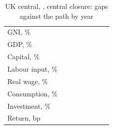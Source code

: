 \begin{table}[htbp]
\centering
\caption{UK central, \Main{}, central closure: gaps against the path by year}
\label{tab:paths}
\small
\begin{tabular}{lrrrrrrr}
\toprule
 & \genRampZeroYear{} & \genShockYear{} & \genYearAfterShock{} & \genYearTwoAfterShock{} & \genHeadYear{} & \genLastFlowYear{} & \genDebtRuleYear{} \\
\midrule
GNI, \%          & \genPathUkCentralGniTwentySeven{} & \genPathUkCentralGniTwentyEight{} & \genPathUkCentralGniTwentyNine{} & \genPathUkCentralGniThirty{} & \genPathUkCentralGniThirtyOne{} & \genPathUkCentralGniThirtyFive{} & \\
GDP, \%          & \genPathUkCentralGdpTwentySeven{} & \genPathUkCentralGdpTwentyEight{} & \genPathUkCentralGdpTwentyNine{} & \genPathUkCentralGdpThirty{} & \genPathUkCentralGdpThirtyOne{} & \genPathUkCentralGdpThirtyFive{} & \\
Capital, \%      & \genPathUkCentralCapitalTwentySeven{} & \genPathUkCentralCapitalTwentyEight{} & \genPathUkCentralCapitalTwentyNine{} & \genPathUkCentralCapitalThirty{} & \genPathUkCentralCapitalThirtyOne{} & \genPathUkCentralCapitalThirtyFive{} & \\
Labour input, \% & \genPathUkCentralLabourTwentySeven{} & \genPathUkCentralLabourTwentyEight{} & \genPathUkCentralLabourTwentyNine{} & \genPathUkCentralLabourThirty{} & \genPathUkCentralLabourThirtyOne{} & \genPathUkCentralLabourThirtyFive{} & \\
Real wage, \%    & \genPathUkCentralWageTwentySeven{} & \genPathUkCentralWageTwentyEight{} & \genPathUkCentralWageTwentyNine{} & \genPathUkCentralWageThirty{} & \genPathUkCentralWageThirtyOne{} & \genPathUkCentralWageThirtyFive{} & \\
Consumption, \%  & \genPathUkCentralConsumptionTwentySeven{} & \genPathUkCentralConsumptionTwentyEight{} & \genPathUkCentralConsumptionTwentyNine{} & \genPathUkCentralConsumptionThirty{} & \genPathUkCentralConsumptionThirtyOne{} & \genPathUkCentralConsumptionThirtyFive{} & \\
Investment, \%   & \genPathUkCentralInvestmentTwentySeven{} & \genPathUkCentralInvestmentTwentyEight{} & \genPathUkCentralInvestmentTwentyNine{} & \genPathUkCentralInvestmentThirty{} & \genPathUkCentralInvestmentThirtyOne{} & \genPathUkCentralInvestmentThirtyFive{} & \\
Return, bp       & \genPathUkCentralInterestBpTwentySeven{} & \genPathUkCentralInterestBpTwentyEight{} & \genPathUkCentralInterestBpTwentyNine{} & \genPathUkCentralInterestBpThirty{} & \genPathUkCentralInterestBpThirtyOne{} & \genPathUkCentralInterestBpThirtyFive{} & \\

\end{tabular}
\end{table}
